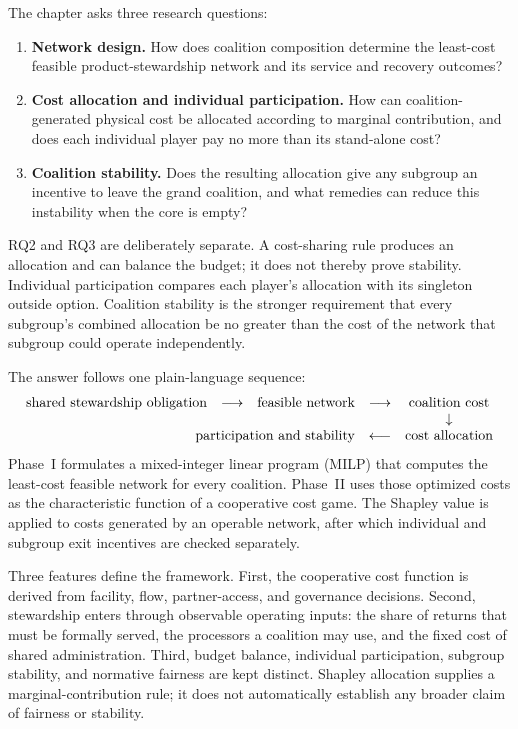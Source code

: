 The chapter asks three research questions:
\begin{enumerate}[label=\textbf{RQ\arabic*:},leftmargin=1.65cm]
    \item \textbf{Network design.} How does coalition composition determine the least-cost feasible product-stewardship network and its service and recovery outcomes?
    \item \textbf{Cost allocation and individual participation.} How can coalition-generated physical cost be allocated according to marginal contribution, and does each individual player pay no more than its stand-alone cost?
    \item \textbf{Coalition stability.} Does the resulting allocation give any subgroup an incentive to leave the grand coalition, and what remedies can reduce this instability when the core is empty?
\end{enumerate}

RQ2 and RQ3 are deliberately separate. A cost-sharing rule produces an allocation and can balance the budget; it does not thereby prove stability. Individual participation compares each player's allocation with its singleton outside option. Coalition stability is the stronger requirement that every subgroup's combined allocation be no greater than the cost of the network that subgroup could operate independently.

The answer follows one plain-language sequence:
\begin{equation*}
\begin{array}{ccccc}
\text{shared stewardship obligation} & \longrightarrow & \text{feasible network} & \longrightarrow & \text{coalition cost} \\
&&&& \downarrow \\
\multicolumn{3}{r}{\text{participation and stability}} & \longleftarrow & \text{cost allocation}
\end{array}
\end{equation*}
Phase~I formulates a mixed-integer linear program (MILP) that computes the least-cost feasible network for every coalition. Phase~II uses those optimized costs as the characteristic function of a cooperative cost game. The Shapley value is applied to costs generated by an operable network, after which individual and subgroup exit incentives are checked separately.

Three features define the framework. First, the cooperative cost function is derived from facility, flow, partner-access, and governance decisions. Second, stewardship enters through observable operating inputs: the share of returns that must be formally served, the processors a coalition may use, and the fixed cost of shared administration. Third, budget balance, individual participation, subgroup stability, and normative fairness are kept distinct. Shapley allocation supplies a marginal-contribution rule; it does not automatically establish any broader claim of fairness or stability.

